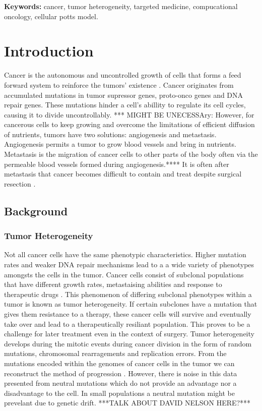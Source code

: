 \documentclass[12pt]{article}
\begin{document}
% 
% 
\textbf{Keywords:} cancer, tumor heterogeneity, targeted medicine, compucational oncology, cellular potts model.

% 
% 

\section{Introduction}

Cancer is the autonomous and uncontrolled growth of cells that forms a feed forward system to reinforce the tumors’ existence \cite{hallmarks}. Cancer originates from accumulated mutations in tumor supressor genes, proto-onco genes and DNA repair genes. These mutations hinder a cell's abillity to regulate its cell cycles, causing it to divide uncontrollably. *** MIGHT BE UNECESSAry: However, for cancerous cells to keep growing and overcome the limitations of efficient diffusion of nutrients, tumors have two solutions: angiogenesis and metastasis. Angiogenesis permits a tumor to grow blood vessels and bring in nutrients. Metastasis is the migration of cancer cells to other parts of the body often via the permeable blood vessels formed during angiogenesis.**** It is often after metastasis that cancer becomes difficult to contain and treat despite surgical resection \cite{Demicheli2008}.

\subsection{Background}
\subsubsection{Tumor Heterogeneity}
Not all cancer cells have the same phenotypic characteristics. Higher mutation rates and weaker DNA repair mechanisms lead to a a wide variety of phenotypes amongsts the cells in the tumor. Cancer cells consist of subclonal populations that have different growth rates, metastaising abilities and response to therapeutic drugs \cite{Heppner1983}. This phenomenon of differing subclonal phenotypes within a tumor is known as tumor heterogeneity. If certain subclones have a mutation that gives them resistance to a therapy, these cancer cells will survive and eventually take over and lead to a therapeutically resiliant population. This proves to be a challenge for later treatment even in the context of surgery. Tumor heterogeneity develops during the mitotic events during cancer division in the form of random mutations, chromosomal rearragements and replication errors. From the mutations encoded within the genomes of cancer cells in the tumor we can reconstruct the method of progression \cite{Naxerova2015}. However, there is noise in this data presented from neutral mutations which do not provide an advantage nor a disadvantage to the cell. In small populations a neutral mutation might be prevelant due to genetic drift. ***TALK ABOUT DAVID NELSON HERE?***
\end{document}
